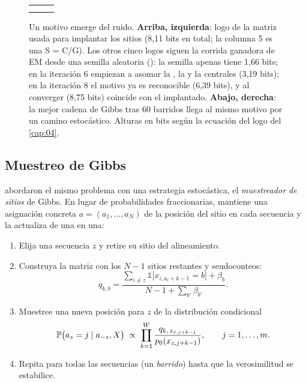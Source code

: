 \begin{figure}[t]
\centering
\begin{tabular}{@{}ccc@{}}
 &  & \\[4pt]
 &  & 
\end{tabular}
\caption[Un motivo emerge del ruido]{Un motivo emerge del ruido. \textbf{Arriba, izquierda}: logo de la matriz usada para implantar los sitios (8,11 bits en total; la columna 5 es una S = C/G). Los otros cinco logos siguen la corrida ganadora de EM desde una semilla aleatoria (): la semilla apenas tiene 1,66 bits; en la iteración 6 empiezan a asomar la , la  y la  centrales (3,19 bits); en la iteración 8 el motivo ya es reconocible (6,39 bits), y al converger (8,75 bits) coincide con el implantado. \textbf{Abajo, derecha}: la mejor cadena de Gibbs tras 60 barridos llega al mismo motivo por un camino estocástico. Alturas en bits según la ecuación del logo del \cref{cap:04}.}
\label{fig:13-logos}
\end{figure}

\subsection{Muestreo de Gibbs}

\textcite{c13-lawrence1993} abordaron el mismo problema con una estrategia estocástica, el \emph{muestreador de sitios} de Gibbs. En lugar de probabilidades fraccionarias, mantiene una asignación concreta $a=(a_1,\dots,a_N)$ de la posición del sitio en cada secuencia y la actualiza de una en una:

\begin{enumerate}
  \item Elija una secuencia $z$ y retire su sitio del alineamiento.
  \item Construya la matriz con los $N-1$ sitios restantes y seudoconteos:
  \begin{equation}\label{eq:13-gibbs-q}
  q_{k,b} = \frac{\sum_{i\ne z}\mathbb 1\bigl[x_{i,a_i+k-1}=b\bigr]+\beta_b}{N-1+\sum_{b'}\beta_{b'}} .
  \end{equation}
  \item Muestree una nueva posición para $z$ de la distribución condicional
  \begin{equation}\label{eq:13-gibbs}
  \mathbb{P}\bigl(a_z=j\mid a_{-z},X\bigr) \;\propto\; \prod_{k=1}^{W}\frac{q_{k,\,x_{z,j+k-1}}}{p_0(x_{z,j+k-1})},\qquad j=1,\dots,m .
  \end{equation}
  \item Repita para todas las secuencias (un \emph{barrido}) hasta que la verosimilitud se estabilice.
\end{enumerate}

